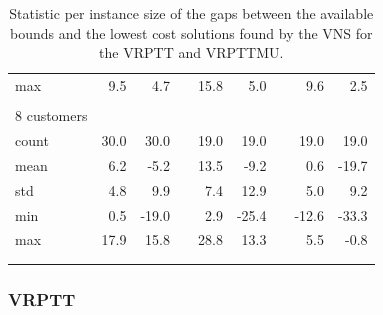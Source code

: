 \begin{longtable}{lrrcrrcrr}
 max   &                 9.5 &                   4.7 &&                 15.8 &                    5.0 &&                  9.6 &                    2.5 \\
 \\
 8 customers \\
 \cmidrule{1-1}
 count &                30.0 &                  30.0 &&                 19.0 &                   19.0 &&                 19.0 &                   19.0 \\
 mean  &                 6.2 &                  -5.2 &&                 13.5 &                   -9.2 &&                  0.6 &                  -19.7 \\
 std   &                 4.8 &                   9.9 &&                  7.4 &                   12.9 &&                  5.0 &                    9.2 \\
 min   &                 0.5 &                 -19.0 &&                  2.9 &                  -25.4 &&                -12.6 &                  -33.3 \\
 max   &                17.9 &                  15.8 &&                 28.8 &                   13.3 &&                  5.5 &                   -0.8 \\
 \bottomrule
 \\
 \caption{Statistic per instance size of the gaps between the available bounds and the lowest cost solutions found by the VNS for the VRPTT and VRPTTMU.
}
 \label{tab:gaps}
 \end{longtable}


\subsubsection{VRPTT}

